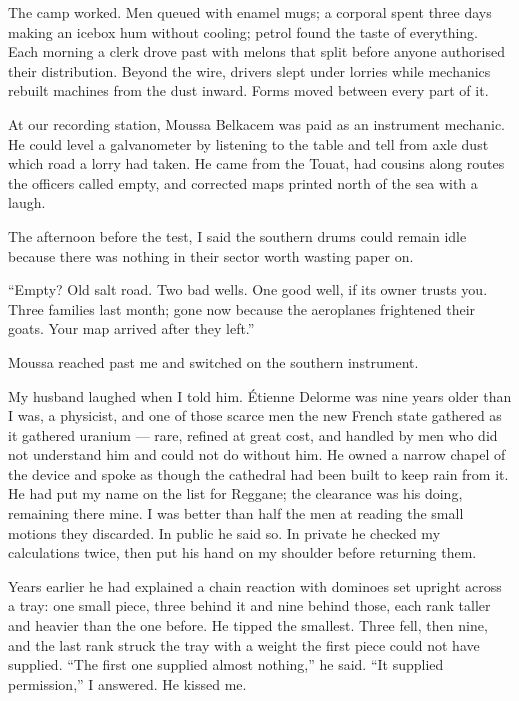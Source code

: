 The camp worked. Men queued with enamel mugs; a corporal spent three days making an icebox hum without cooling; petrol found the taste of everything. Each morning a clerk drove past with melons that split before anyone authorised their distribution. Beyond the wire, drivers slept under lorries while mechanics rebuilt machines from the dust inward. Forms moved between every part of it.\par

At our recording station, Moussa Belkacem was paid as an instrument mechanic. He could level a galvanometer by listening to the table and tell from axle dust which road a lorry had taken. He came from the Touat, had cousins along routes the officers called empty, and corrected maps printed north of the sea with a laugh.\par

The afternoon before the test, I said the southern drums could remain idle because there was nothing in their sector worth wasting paper on.\par

“Empty? Old salt road. Two bad wells. One good well, if its owner trusts you. Three families last month; gone now because the aeroplanes frightened their goats. Your map arrived after they left.”\par

Moussa reached past me and switched on the southern instrument.\par

My husband laughed when I told him. Étienne Delorme was nine years older than I was, a physicist, and one of those scarce men the new French state gathered as it gathered uranium --- rare, refined at great cost, and handled by men who did not understand him and could not do without him. He owned a narrow chapel of the device and spoke as though the cathedral had been built to keep rain from it. He had put my name on the list for Reggane; the clearance was his doing, remaining there mine. I was better than half the men at reading the small motions they discarded. In public he said so. In private he checked my calculations twice, then put his hand on my shoulder before returning them.\par

Years earlier he had explained a chain reaction with dominoes set upright across a tray: one small piece, three behind it and nine behind those, each rank taller and heavier than the one before. He tipped the smallest. Three fell, then nine, and the last rank struck the tray with a weight the first piece could not have supplied. “The first one supplied almost nothing,” he said. “It supplied permission,” I answered. He kissed me.\par

